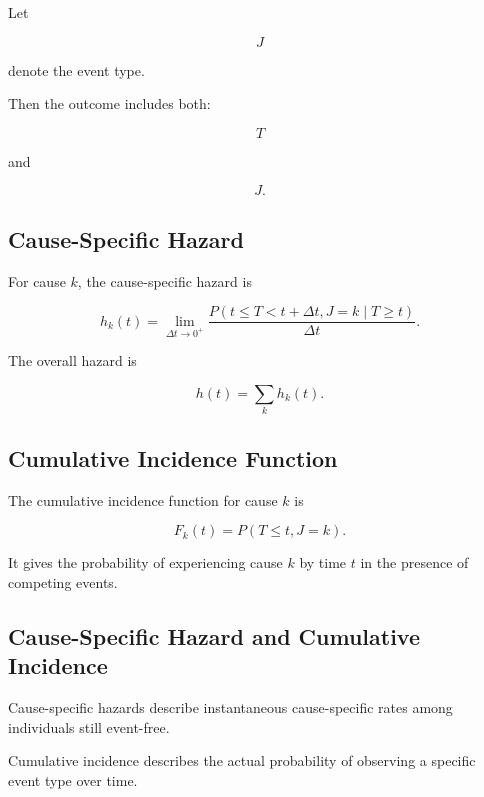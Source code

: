 Let

\[
J
\]

denote the event type.

Then the outcome includes both:

\[
\boxed{
T
}
\]

and

\[
\boxed{
J.
}
\]

\subsection{Cause-Specific Hazard}
\label{subsec:cause-specific-hazard}

For cause \(k\), the cause-specific hazard is

\[
\boxed{
h_k(t)
=
\lim_{\Delta t\to0^+}
\frac{
P
(
t\leq T<t+\Delta t,
J=k
\mid
T\geq t
)
}{
\Delta t
}.
}
\]

The overall hazard is

\[
\boxed{
h(t)
=
\sum_k
h_k(t).
}
\]

\subsection{Cumulative Incidence Function}
\label{subsec:cumulative-incidence-function}

The cumulative incidence function for cause \(k\) is

\[
\boxed{
F_k(t)
=
P
(
T\leq t,
J=k
).
}
\]

It gives the probability of experiencing cause \(k\) by time \(t\) in
the presence of competing events.

\subsection{Cause-Specific Hazard and Cumulative Incidence}
\label{subsec:csh-versus-cif}

Cause-specific hazards describe instantaneous cause-specific rates among
individuals still event-free.

Cumulative incidence describes the actual probability of observing a
specific event type over time.

